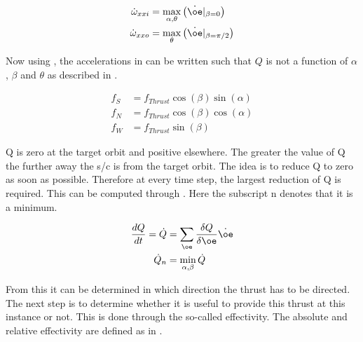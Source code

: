 
\begin{equation} \label{eq:omega_dot}
\begin{split}
\dot{\omega}_{xxi} &=\displaystyle\max_{\alpha,\theta}\left(\dot{\oe}|_{\beta=0}\right)\\
\dot{\omega}_{xxo} &=\displaystyle\max_{\theta}\left(\dot{\oe}|_{\beta=\pi/2}\right)
\end{split}
\end{equation}

Now using , the accelerations in  can be written such that $Q$ is not a function of $\alpha$, $\beta$ and $\theta$ as described in \cite{petropoulos2005refinements}.

\begin{equation} \label{eq:fthrust}
\begin{split}
f_{S}&=f_{Thrust}\cos\left(\beta\right)\sin\left(\alpha\right)\\
f_{N}&=f_{Thrust}\cos\left(\beta\right)\cos\left(\alpha\right)\\
f_{W}&=f_{Thrust}\sin\left(\beta\right)
\end{split}
\end{equation}


Q is zero at the target orbit and positive elsewhere. The greater the value of Q the further away the \ac{s/c} is from the target orbit. The idea is to reduce Q to zero as soon as possible. Therefore at every time step, the largest reduction of Q is required. This can be computed through . Here the subscript n denotes that it is a minimum.

\begin{equation} \label{eq:qdot}
\begin{split}
\dfrac{dQ}{dt}=\dot{Q}&=\displaystyle\sum_{\oe}\dfrac{\delta Q}{\delta \oe}\dot{\oe}\\
\dot{Q}_{n} &= \displaystyle\min_{\alpha,\beta}\dot{Q}
\end{split}
\end{equation}

From this it can be determined in which direction the thrust has to be directed. The next step is to determine whether it is useful to provide this thrust at this instance or not. This is done through the so-called effectivity. The absolute and relative effectivity are defined as in .

